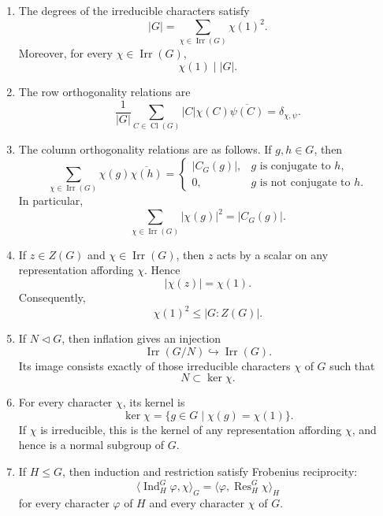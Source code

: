 \begin{theorem}
\begin{enumerate}
    \item[(vi)] The degrees of the irreducible characters satisfy
    \[
    |G|
    =
    \sum_{\chi\in\operatorname{Irr}(G)}\chi(1)^2.
    \]
    Moreover, for every \(\chi\in\operatorname{Irr}(G)\),
    \[
    \chi(1)\mid |G|.
    \]

    \item[(vii)] The row orthogonality relations are
    \[
    \frac{1}{|G|}
    \sum_{C\in\operatorname{Cl}(G)}
    |C|\chi(C)\overline{\psi(C)}
    =
    \delta_{\chi,\psi}.
    \]

    \item[(viii)] The column orthogonality relations are as follows. If
    \(g,h\in G\), then
    \[
    \sum_{\chi\in\operatorname{Irr}(G)}
    \chi(g)\overline{\chi(h)}
    =
    \begin{cases}
    |C_G(g)|, & g \text{ is conjugate to } h,\\
    0, & g \text{ is not conjugate to } h.
    \end{cases}
    \]
    In particular,
    \[
    \sum_{\chi\in\operatorname{Irr}(G)}|\chi(g)|^2
    =
    |C_G(g)|.
    \]

    \item[(ix)] If \(z\in Z(G)\) and \(\chi\in\operatorname{Irr}(G)\), then
    \(z\) acts by a scalar on any representation affording \(\chi\). Hence
    \[
    |\chi(z)|=\chi(1).
    \]
    Consequently,
    \[
    \chi(1)^2\leq |G:Z(G)|.
    \]

    \item[(x)] If \(N\triangleleft G\), then inflation gives an injection
    \[
    \operatorname{Irr}(G/N)\hookrightarrow \operatorname{Irr}(G).
    \]
    Its image consists exactly of those irreducible characters \(\chi\) of
    \(G\) such that
    \[
    N\subset \ker \chi.
    \]

    \item[(xi)] For every character \(\chi\), its kernel is
    \[
    \ker\chi
    =
    \{g\in G\mid \chi(g)=\chi(1)\}.
    \]
    If \(\chi\) is irreducible, this is the kernel of any representation
    affording \(\chi\), and hence is a normal subgroup of \(G\).

    \item[(xii)] If \(H\leq G\), then induction and restriction satisfy
    Frobenius reciprocity:
    \[
    \langle \operatorname{Ind}_H^G\varphi,\chi\rangle_G
    =
    \langle \varphi,\operatorname{Res}_H^G\chi\rangle_H
    \]
    for every character \(\varphi\) of \(H\) and every character \(\chi\) of
    \(G\).


\end{enumerate}
\end{theorem}
